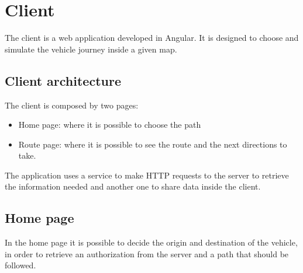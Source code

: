 \chapter{Client}\label{Chap:Client}
The client is a web application developed in Angular. It is designed to choose and simulate the vehicle journey inside a given map.

\section{Client architecture}
The client is composed by two pages:
\begin{itemize}
	\item Home page: where it is possible to choose the path
	\item Route page: where it is possible to see the route and the next directions to take.
\end{itemize}
The application uses a service to make HTTP requests to the server to retrieve the information needed and another one to share data inside the client.

\section{Home page}
In the home page it is possible to decide the origin and destination of the vehicle, in order to retrieve an authorization from the server and a path that should be followed.
